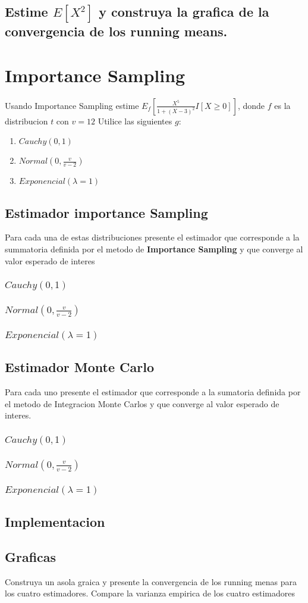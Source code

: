 \documentclass{article}
\begin{document}
\subsection{Estime $E[X^2]$ y construya la grafica de la convergencia de los running means.}

\section{Importance Sampling}

Usando Importance Sampling estime $E_f\left[ \frac{X^5}{1+(X - 3)^2}I[X \ge 0] \right]$, donde $f$ es la
distribucion $t$ con $v=12$ Utilice las siguientes $g$:
\begin{enumerate}
	\item $Cauchy(0,1)$
	\item $Normal(0, \frac{v}{v-2})$
	\item $Exponencial(\lambda=1)$
\end{enumerate}

\subsection{Estimador importance Sampling}
Para cada una de estas distribuciones presente el estimador que corresponde a la summatoria definida
por el metodo de \textbf{Importance Sampling} y que converge al valor esperado de interes
\subsubsection{$Cauchy(0,1)$}
\subsubsection{$Normal(0, \frac{v}{v-2})$}
\subsubsection{$Exponencial(\lambda=1)$}

\subsection{Estimador Monte Carlo}
Para cada uno presente el estimador que corresponde a la sumatoria definida por el metodo de Integracion
Monte Carlos y que converge al valor esperado de interes.
\subsubsection{$Cauchy(0,1)$}
\subsubsection{$Normal(0, \frac{v}{v-2})$}
\subsubsection{$Exponencial(\lambda=1)$}

\subsection{Implementacion}

\subsection{Graficas}
Construya un asola graica y presente la convergencia de los running menas para los cuatro estimadores. Compare la varianza empirica de los
cuatro estimadores
\end{document}
